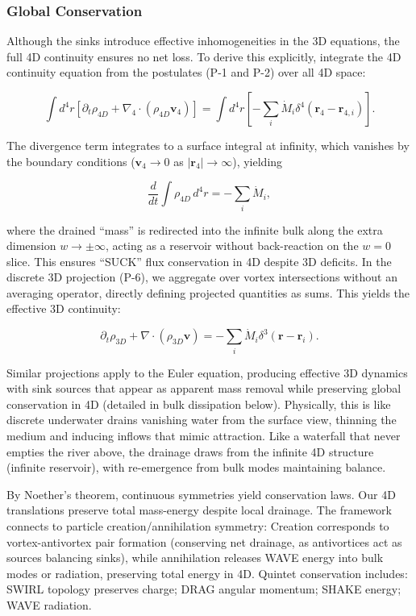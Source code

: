 \subsubsection{Global Conservation}
Although the sinks introduce effective inhomogeneities in the 3D equations, the full 4D continuity ensures no net loss. To derive this explicitly, integrate the 4D continuity equation from the postulates (P-1 and P-2) over all 4D space:

\begin{equation}
\int d^4 r \left[ \partial_t \rho_{4D} + \nabla_4 \cdot (\rho_{4D} \mathbf{v}_4) \right] = \int d^4 r \left[ -\sum_i \dot{M}_i \delta^4(\mathbf{r}_4 - \mathbf{r}_{4,i}) \right].
\end{equation}

The divergence term integrates to a surface integral at infinity, which vanishes by the boundary conditions ($\mathbf{v}_4 \to 0$ as $|\mathbf{r}_4| \to \infty$), yielding

\begin{equation}
\frac{d}{dt} \int \rho_{4D} \, d^4 r = -\sum_i \dot{M}_i,
\end{equation}

where the drained ``mass'' is redirected into the infinite bulk along the extra dimension $w \to \pm \infty$, acting as a reservoir without back-reaction on the $w=0$ slice. This ensures ``SUCK'' flux conservation in 4D despite 3D deficits. In the discrete 3D projection (P-6), we aggregate over vortex intersections without an averaging operator, directly defining projected quantities as sums. This yields the effective 3D continuity:

\begin{equation}
\partial_t \rho_{3D} + \nabla \cdot (\rho_{3D} \mathbf{v}) = -\sum_i \dot{M}_i \delta^3(\mathbf{r} - \mathbf{r}_i).
\end{equation}

Similar projections apply to the Euler equation, producing effective 3D dynamics with sink sources that appear as apparent mass removal while preserving global conservation in 4D (detailed in bulk dissipation below). Physically, this is like discrete underwater drains vanishing water from the surface view, thinning the medium and inducing inflows that mimic attraction. Like a waterfall that never empties the river above, the drainage draws from the infinite 4D structure (infinite reservoir), with re-emergence from bulk modes maintaining balance.

By Noether's theorem, continuous symmetries yield conservation laws. Our 4D translations preserve total mass-energy despite local drainage. The framework connects to particle creation/annihilation symmetry: Creation corresponds to vortex-antivortex pair formation (conserving net drainage, as antivortices act as sources balancing sinks), while annihilation releases WAVE energy into bulk modes or radiation, preserving total energy in 4D. Quintet conservation includes: SWIRL topology preserves charge; DRAG angular momentum; SHAKE energy; WAVE radiation.


